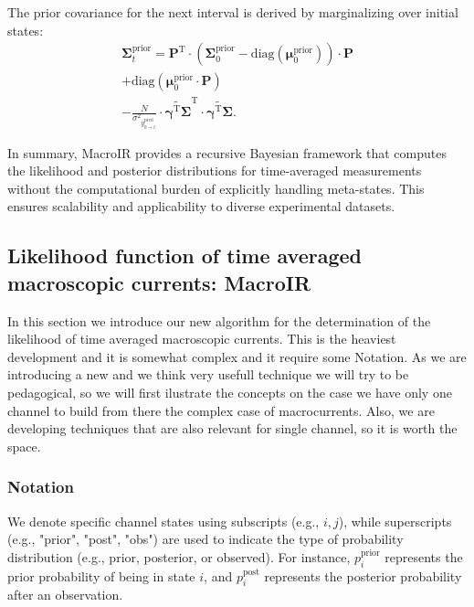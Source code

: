 \documentclass[pdflatex,sn-mathphys-num]{sn-jnl}%
\theoremstyle{thmstyleone}%
\theoremstyle{thmstyletwo}%
\theoremstyle{thmstylethree}%
\begin{document}
The prior covariance for the next interval is derived by marginalizing over initial states:
\begin{multline}
	\boldsymbol{\Sigma}^{\mathrm{prior}}_{t} = 
	\boldsymbol{P}^{\mathrm{T}} \cdot \left( \boldsymbol{\Sigma}^{\mathrm{prior}}_{0} - \mathrm{diag}(\boldsymbol{\mu}^{\mathrm{prior}}_{0}) \right) \cdot \boldsymbol{P} \\
	+ \mathrm{diag}(\boldsymbol{\mu}^{\mathrm{prior}}_{0} \cdot \boldsymbol{P}) \\
	- \frac{N}{{\sigma^2}_{\overline{y}^{\mathrm{pred}}_{0 \rightarrow t}}} \cdot
	\widetilde{\boldsymbol{\gamma}^{\mathrm{T}} \boldsymbol{\Sigma}}^{\mathrm{T}} \cdot \widetilde{\boldsymbol{\gamma}^{\mathrm{T}} \boldsymbol{\Sigma}}.
	\label{eq:prior_covariance_update_0_t}
\end{multline}

In summary, MacroIR provides a recursive Bayesian framework that computes the likelihood and posterior distributions for time-averaged measurements without the computational burden of explicitly handling meta-states. This ensures scalability and applicability to diverse experimental datasets.

\subsection{Likelihood function of time averaged macroscopic currents: MacroIR}
In this section we introduce our new algorithm for the determination of the likelihood of time averaged macroscopic currents. This is the heaviest development and it is somewhat complex and it require some Notation.  
As we are introducing a new and we think very usefull technique we will try to be pedagogical, so we will first ilustrate the concepts on the case we have only one channel to build from there the complex case of macrocurrents. Also, we are developing techniques that are also relevant for single channel, so it is worth the space.   

\subsubsection{Notation}
We denote specific channel states using subscripts (e.g., \( i, j \)), while superscripts (e.g., "prior", "post", "obs") are used to indicate the type of probability distribution (e.g., prior, posterior, or observed). For instance, \( p_i^{\text{prior}} \) represents the prior probability of being in state \( i \), and \( p_i^{\text{post}} \) represents the posterior probability after an observation.

\end{document}
